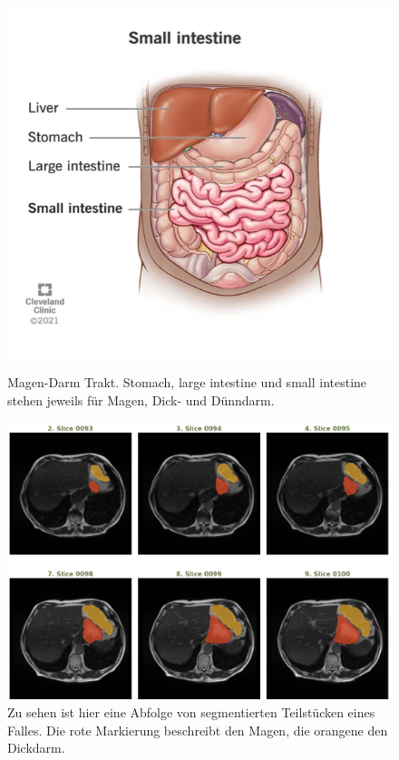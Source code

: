 \begin{figure}[H]
   \begin{minipage}{0.48\textwidth}
     \centering
     \includegraphics[width=1\linewidth]{bilder/intestines}
     \caption{Magen-Darm Trakt. Stomach, large intestine und small intestine stehen jeweils für Magen, Dick- und Dünndarm. }
   \end{minipage}\label{Fig:magen-darm-trakt}
   \hfill
   \begin{minipage}{0.48\textwidth}
     \centering
     \includegraphics[width=1\linewidth]{LaTex/bilder/beispieldaten.png}
     \caption{ Zu sehen ist hier eine Abfolge von segmentierten Teilstücken eines Falles. Die rote Markierung beschreibt den Magen, die orangene den Dickdarm.}
   \end{minipage}\label{Fig:magen-mrt}
\end{figure}

